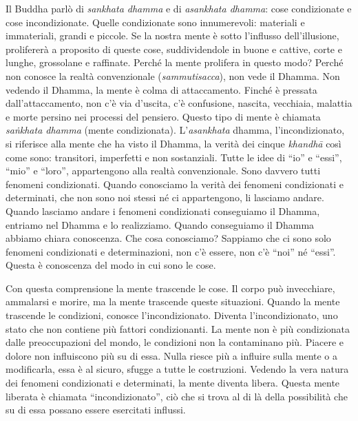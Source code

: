 Il Buddha parlò di \emph{sankhata dhamma} e di \emph{asankhata dhamma}:
cose condizionate e cose incondizionate. Quelle condizionate sono
innumerevoli: materiali e immateriali, grandi e piccole. Se la nostra
mente è sotto l'influsso dell'illusione, prolifererà a proposito di
queste cose, suddividendole in buone e cattive, corte e lunghe,
grossolane e raffinate. Perché la mente prolifera in questo modo? Perché
non conosce la realtà convenzionale (\emph{sammutisacca}), non vede il
Dhamma. Non vedendo il Dhamma, la mente è colma di attaccamento. Finché
è pressata dall'attaccamento, non c'è via d'uscita, c'è confusione,
nascita, vecchiaia, malattia e morte persino nei processi del pensiero.
Questo tipo di mente è chiamata \emph{saṅkhata dhamma} (mente
condizionata). L'\emph{asankhata} dhamma, l'incondizionato, si
riferisce alla mente che ha visto il Dhamma, la verità dei cinque
\emph{khandhā} così come sono: transitori, imperfetti e non sostanziali.
Tutte le idee di ``io'' e ``essi'', ``mio'' e ``loro'', appartengono
alla realtà convenzionale. Sono davvero tutti fenomeni condizionati.
Quando conosciamo la verità dei fenomeni condizionati e determinati, che
non sono noi stessi né ci appartengono, li lasciamo andare. Quando
lasciamo andare i fenomeni condizionati conseguiamo il Dhamma, entriamo
nel Dhamma e lo realizziamo. Quando conseguiamo il Dhamma abbiamo chiara
conoscenza. Che cosa conosciamo? Sappiamo che ci sono solo fenomeni
condizionati e determinazioni, non c'è essere, non c'è ``noi'' né
``essi''. Questa è conoscenza del modo in cui sono le cose.

Con questa comprensione la mente trascende le cose. Il corpo può
invecchiare, ammalarsi e morire, ma la mente trascende queste
situazioni. Quando la mente trascende le condizioni, conosce
l'incondizionato. Diventa l'incondizionato, uno stato che non contiene
più fattori condizionanti. La mente non è più condizionata dalle
preoccupazioni del mondo, le condizioni non la contaminano più. Piacere
e dolore non influiscono più su di essa. Nulla riesce più a influire
sulla mente o a modificarla, essa è al sicuro, sfugge a tutte le
costruzioni. Vedendo la vera natura dei fenomeni condizionati e
determinati, la mente diventa libera. Questa mente liberata è chiamata
``incondizionato'', ciò che si trova al di là della possibilità che su
di essa possano essere esercitati influssi.

